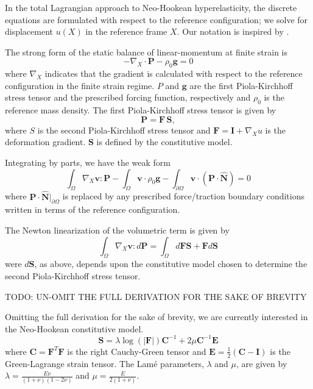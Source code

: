 In the total Lagrangian approach to Neo-Hookean hyperelasticity, the discrete equations are formulated with respect to the reference configuration; we solve for displacement $u \left( X \right)$ in the reference frame $X$.
Our notation is inspired by \cite{holzapfel2000nonlinear}.

The strong form of the static balance of linear-momentum at finite strain is
\begin{equation}
- \nabla_X \cdot \boldsymbol{P} - \rho_0 \boldsymbol{g} = 0
\label{finite_strong}
\end{equation}
where $\nabla_X$ indicates that the gradient is calculated with respect to the reference configuration in the finite strain regime.
$P$ and $\boldsymbol{g}$ are the first Piola-Kirchhoff stress tensor and the prescribed forcing function, respectively and $\rho_0$ is the reference mass density.
The first Piola-Kirchhoff stress tensor is given by
\begin{equation}
\boldsymbol{P} = \boldsymbol{F} \, \boldsymbol{S},
\label{first_pk}
\end{equation}
where $S$ is the second Piola-Kirchhoff stress tensor and $\boldsymbol{F} = \boldsymbol{I} + \nabla_X u$ is the deformation gradient.
$\boldsymbol{S}$ is defined by the constitutive model.

Integrating by parts, we have the weak form
\begin{equation}
\int_{\Omega}{\nabla_X \boldsymbol{v} \colon \boldsymbol{P}} - \int_{\Omega}{\boldsymbol{v} \cdot \rho_0 \boldsymbol{g}} - \int_{\partial \Omega}{\boldsymbol{v} \cdot (\boldsymbol{P} \cdot \hat{\boldsymbol{N}})} = 0
\label{finite_weak}
\end{equation}
where $\boldsymbol{P} \cdot \hat{\boldsymbol{N}}|_{\partial\Omega}$ is replaced by any prescribed force/traction boundary conditions written in terms of the reference configuration.

The Newton linearization of the volumetric term is given by
\begin{equation}
\int_{\Omega}{\nabla_X \boldsymbol{v} : d \boldsymbol{P}} = \int_{\Omega} d \boldsymbol{F} \boldsymbol{S} + \boldsymbol{F} d \boldsymbol{S}
\label{finite_weak_linear}
\end{equation}
were $d \boldsymbol{S}$, as above, depends upon the constitutive model chosen to determine the second Piola-Kirchhoff stress tensor.

TODO: UN-OMIT THE FULL DERIVATION FOR THE SAKE OF BREVITY

Omitting the full derivation for the sake of brevity, we are currently interested in the Neo-Hookean constitutive model.
\begin{equation}
\boldsymbol{S} = \lambda \log \left( \lvert \boldsymbol{F} \rvert \right) \boldsymbol{C}^{-1} + 2 \mu \boldsymbol{C}^{-1} \boldsymbol{E}
\label{constitutive}
\end{equation}
where $\boldsymbol{C} = \boldsymbol{F}^T \boldsymbol{F}$ is the right Cauchy-Green tensor and $\boldsymbol{E} = \frac{1}{2} \left( \boldsymbol{C} - \boldsymbol{I} \right)$ is the Green-Lagrange strain tensor.
The Lam{\'e} parameters, $\lambda$ and $\mu$, are given by $\lambda = \frac{E \nu}{\left( 1 + \nu \right)\left( 1 - 2 \nu \right)}$ and $\mu = \frac{E}{2 \left( 1 + \nu \right)}$.

